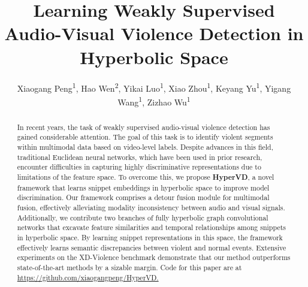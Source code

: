 \documentclass[sigconf]{acmart}
\begin{document}
\title{Learning Weakly Supervised Audio-Visual Violence Detection in Hyperbolic Space}




\author{Xiaogang Peng\textsuperscript{1}\footnotemark[1], Hao Wen\textsuperscript{2}\footnotemark[1], Yikai Luo\textsuperscript{1}\footnotemark[1], Xiao Zhou\textsuperscript{1}, Keyang Yu\textsuperscript{1}, Yigang Wang\textsuperscript{1}, Zizhao Wu\textsuperscript{1}\footnotemark[2]}























\renewcommand{\shortauthors}{Peng and Wen and Luo, et al.}


\begin{abstract}
In recent years, the task of weakly supervised audio-visual violence detection has gained considerable attention. The goal of this task is to identify violent segments within multimodal data based on video-level labels. Despite advances in this field, traditional Euclidean neural networks, which have been used in prior research, encounter difficulties in capturing highly discriminative representations due to limitations of the feature space. To overcome this, we propose \textbf{HyperVD}, a novel framework that learns snippet embeddings in hyperbolic space to improve model discrimination. Our framework comprises a detour fusion module for multimodal fusion, effectively alleviating modality inconsistency between audio and visual signals. Additionally, we contribute two branches of fully hyperbolic graph convolutional networks that excavate feature similarities and temporal relationships among snippets in hyperbolic space. By learning snippet representations in this space, the framework effectively learns semantic discrepancies between violent and normal events. Extensive experiments on the XD-Violence benchmark demonstrate that our method outperforms state-of-the-art methods by a sizable margin. Code for this paper are at \href{https://github.com/xiaogangpeng/HyperVD}{https://github.com/xiaogangpeng/HyperVD.}
\end{abstract}
\end{document}
